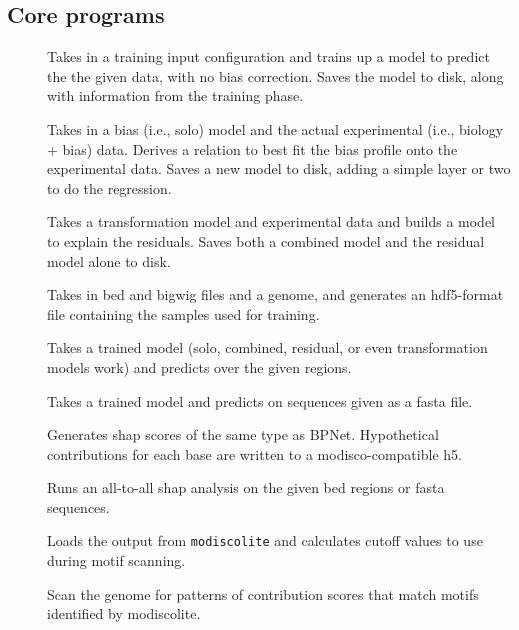 \documentclass{article}
\begin{document}
\subsection{Core programs}

\begin{description}
    \item [] Takes in a training input configuration
        and trains up a model to predict the the given data, with no bias
        correction.
        Saves the model to disk, along with information from the training phase.
    \item [] Takes in a bias (i.e., solo)
        model and the actual experimental (i.e., biology + bias) data.
        Derives a relation to best fit the bias profile onto the experimental
        data.
        Saves a new model to disk, adding a simple layer or two to do the
        regression.
    \item [] Takes a transformation model and
        experimental data and builds a model to explain the residuals.
        Saves both a combined model and the residual model alone to disk.
    \item [] Takes in bed and bigwig files and a
        genome, and generates an hdf5-format file containing the samples used
        for training.
    \item [] Takes a trained model (solo, combined,
        residual, or even transformation models work) and predicts over the
        given regions.
    \item [] Takes a trained model and predicts
        on sequences given as a fasta file.
    \item [] Generates shap scores of the same type as
        BPNet.
        Hypothetical contributions for each base are written to a
        modisco-compatible h5.
    \item [] Runs an all-to-all shap analysis on the
        given bed regions or fasta sequences.
    \item [] Loads the output from
        \texttt{modiscolite} and calculates cutoff values to use during motif
        scanning.
    \item [] Scan the genome for patterns of contribution
        scores that match motifs identified by modiscolite.
\end{description}
\end{document}
